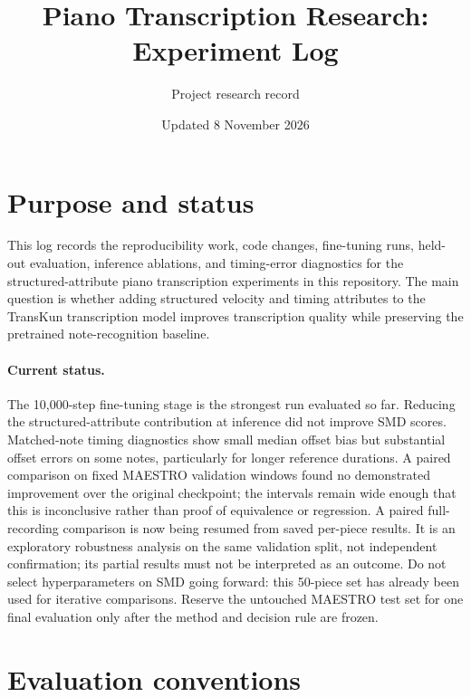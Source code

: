\documentclass[11pt]{article}
\title{Piano Transcription Research: Experiment Log}
\author{Project research record}
\date{Updated 8 November 2026}
\begin{document}
\maketitle

\section{Purpose and status}

This log records the reproducibility work, code changes, fine-tuning runs,
held-out evaluation, inference ablations, and timing-error diagnostics for the
structured-attribute piano transcription experiments in this repository. The
main question is whether adding structured velocity and timing attributes to
the TransKun transcription model improves transcription quality while
preserving the pretrained note-recognition baseline.

\paragraph{Current status.}
The 10,000-step fine-tuning stage is the strongest run evaluated so far.
Reducing the structured-attribute contribution at inference did not improve
SMD scores. Matched-note timing diagnostics show small median offset bias but
substantial offset errors on some notes, particularly for longer reference
durations. A paired comparison on fixed MAESTRO validation windows found no
demonstrated improvement over the original checkpoint; the intervals remain
wide enough that this is inconclusive rather than proof of equivalence or
regression. A paired full-recording comparison is now being resumed from
saved per-piece results. It is an exploratory robustness analysis on the
same validation split, not independent confirmation; its partial results
must not be interpreted as an outcome. Do not select hyperparameters on SMD
going forward: this 50-piece set has already been used for iterative
comparisons. Reserve the untouched MAESTRO test set for one final evaluation
only after the method and decision rule are frozen.

\section{Evaluation conventions}
\end{document}
